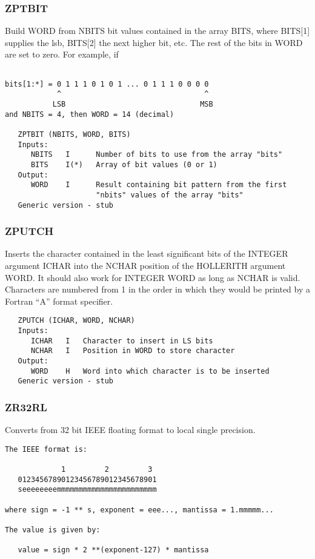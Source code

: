 \subsubsection{ZPTBIT}
Build WORD from NBITS bit values contained in the array BITS, where
BITS[1] supplies the lsb, BITS[2] the next higher bit, etc.  The
rest of the bits in WORD are set to zero.  For example, if
\begin{verbatim}

bits[1:*] = 0 1 1 1 0 1 0 1 ... 0 1 1 1 0 0 0 0
            ^                                 ^
           LSB                               MSB
and NBITS = 4, then WORD = 14 (decimal)

   ZPTBIT (NBITS, WORD, BITS)
   Inputs:
      NBITS   I      Number of bits to use from the array "bits"
      BITS    I(*)   Array of bit values (0 or 1)
   Output:
      WORD    I      Result containing bit pattern from the first
                     "nbits" values of the array "bits"
   Generic version - stub
\end{verbatim}

\subsubsection{ZPUTCH}
Inserts the character contained in the least significant bits of
the INTEGER argument ICHAR into the NCHAR position of the HOLLERITH
argument WORD.  It should also work for INTEGER WORD as long as
NCHAR is valid.  Characters are numbered from 1 in the order in
which they would be printed by a Fortran ``A'' format specifier.
\begin{verbatim}
   ZPUTCH (ICHAR, WORD, NCHAR)
   Inputs:
      ICHAR   I   Character to insert in LS bits
      NCHAR   I   Position in WORD to store character
   Output:
      WORD    H   Word into which character is to be inserted
   Generic version - stub
\end{verbatim}

\subsubsection{ZR32RL}
Converts from 32 bit IEEE floating format to local single precision.

\begin{verbatim}
The IEEE format is:

             1         2         3
   01234567890123456789012345678901
   seeeeeeeemmmmmmmmmmmmmmmmmmmmmmm

where sign = -1 ** s, exponent = eee..., mantissa = 1.mmmmm...

The value is given by:

   value = sign * 2 **(exponent-127) * mantissa
\end{verbatim}

